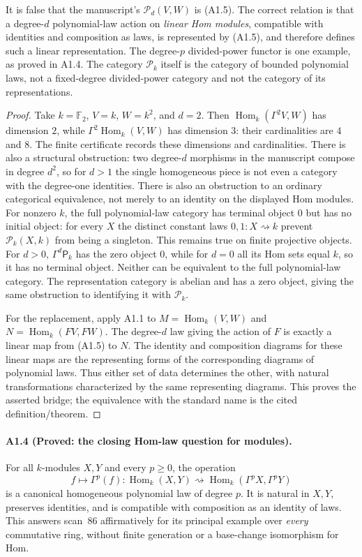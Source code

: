It is false that the manuscript's $\mathcal P_d(V,W)$ is (A1.5).
The correct relation is that a degree-$d$ polynomial-law action on
\emph{linear Hom modules}, compatible with identities and composition
as laws, is represented by (A1.5), and therefore defines such a linear
representation. The degree-$p$ divided-power functor is one example,
as proved in A1.4. The category $\mathcal P_k$ itself is the category of
bounded polynomial laws, not a fixed-degree divided-power category and
not the category of its representations.

\begin{proof}
Take $k=\mathbb F_2$, $V=k$, $W=k^2$, and $d=2$. Then
$\operatorname{Hom}_k(\Gamma^2 V,W)$ has dimension $2$, while
$\Gamma^2\operatorname{Hom}_k(V,W)$ has dimension $3$: their cardinalities
are $4$ and $8$. The finite certificate records these dimensions and
cardinalities. There is also a structural obstruction: two degree-$d$
morphisms in the manuscript compose in degree $d^2$, so for $d>1$ the
single homogeneous piece is not even a category with the degree-one
identities. There is also an obstruction to an ordinary categorical
equivalence, not merely to an identity on the displayed Hom modules.
For nonzero $k$, the full polynomial-law category has terminal object
$0$ but has no initial object: for every $X$ the distinct constant
laws $0,1:X\rightsquigarrow k$ prevent $\mathcal P_k(X,k)$ from
being a singleton. This remains true on finite projective objects.
For $d>0$, $\Gamma^d\mathsf P_k$ has the zero object $0$, while
for $d=0$ all its Hom sets equal $k$, so it has no terminal object.
Neither can be equivalent to the full polynomial-law category.
The representation category is abelian and has a zero object, giving
the same obstruction to identifying it with $\mathcal P_k$.

For the replacement, apply A1.1 to $M=\operatorname{Hom}_k(V,W)$ and
$N=\operatorname{Hom}_k(FV,FW)$. The degree-$d$ law giving the action of
$F$ is exactly a linear map from (A1.5) to $N$. The identity and
composition diagrams for these linear maps are the representing forms
of the corresponding diagrams of polynomial laws. Thus either set of
data determines the other, with natural transformations characterized
by the same representing diagrams. This proves the asserted bridge;
the equivalence with the standard name is the cited definition/theorem.
\end{proof}

\paragraph{A1.4 (Proved: the closing Hom-law question for modules).}
For all $k$-modules $X,Y$ and every $p\geq0$, the operation
\[
 f\longmapsto\Gamma^p(f):
 \operatorname{Hom}_k(X,Y)\rightsquigarrow
 \operatorname{Hom}_k(\Gamma^pX,\Gamma^pY)
 \tag{A1.6}
\]
is a canonical homogeneous polynomial law of degree $p$. It is natural
in $X,Y$, preserves identities, and is compatible with composition as
an identity of laws. This answers scan~86 affirmatively for its principal
example over \emph{every} commutative ring, without finite generation
or a base-change isomorphism for Hom.

